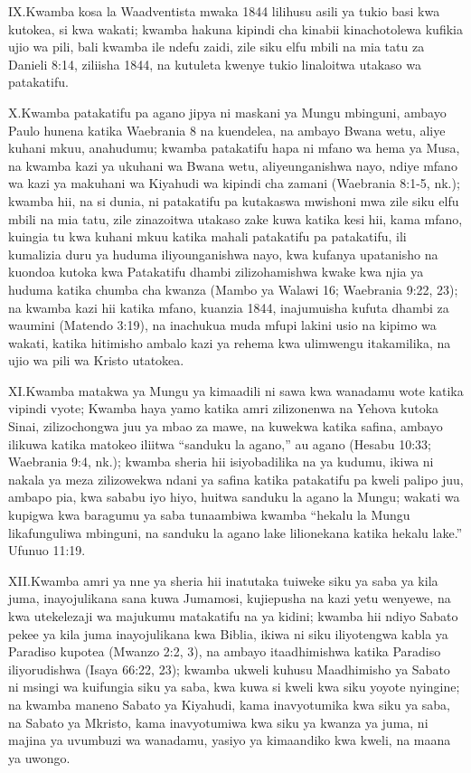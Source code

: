 \lettrine{IX.} Kwamba kosa la Waadventista mwaka 1844 lilihusu asili ya tukio basi kwa kutokea, si kwa wakati; kwamba hakuna kipindi cha kinabii kinachotolewa kufikia ujio wa pili, bali kwamba ile ndefu zaidi, zile siku elfu mbili na mia tatu za Danieli 8:14, ziliisha 1844, na kutuleta kwenye tukio linaloitwa utakaso wa patakatifu.


\lettrine{X.} Kwamba patakatifu pa agano jipya ni maskani ya Mungu mbinguni, ambayo Paulo hunena katika Waebrania 8 na kuendelea, na ambayo Bwana wetu, aliye kuhani mkuu, anahudumu; kwamba patakatifu hapa ni mfano wa hema ya Musa, na kwamba kazi ya ukuhani wa Bwana wetu, aliyeunganishwa nayo, ndiye mfano wa kazi ya makuhani wa Kiyahudi wa kipindi cha zamani (Waebrania 8:1-5, nk.); kwamba hii, na si dunia, ni patakatifu pa kutakaswa mwishoni mwa zile siku elfu mbili na mia tatu, zile zinazoitwa utakaso zake kuwa katika kesi hii, kama mfano, kuingia tu kwa kuhani mkuu katika mahali patakatifu pa patakatifu, ili kumalizia duru ya huduma iliyounganishwa nayo, kwa kufanya upatanisho na kuondoa kutoka kwa Patakatifu dhambi zilizohamishwa kwake kwa njia ya huduma katika chumba cha kwanza (Mambo ya Walawi 16; Waebrania 9:22, 23); na kwamba kazi hii katika mfano, kuanzia 1844, inajumuisha kufuta dhambi za waumini (Matendo 3:19), na inachukua muda mfupi lakini usio na kipimo wa wakati, katika hitimisho ambalo kazi ya rehema kwa ulimwengu itakamilika, na ujio wa pili wa Kristo utatokea.


\lettrine{XI.} Kwamba matakwa ya Mungu ya kimaadili ni sawa kwa wanadamu wote katika vipindi vyote; Kwamba haya yamo katika amri zilizonenwa na Yehova kutoka Sinai, zilizochongwa juu ya mbao za mawe, na kuwekwa katika safina, ambayo ilikuwa katika matokeo iliitwa “sanduku la agano,” au agano (Hesabu 10:33; Waebrania 9:4, nk.); kwamba sheria hii isiyobadilika na ya kudumu, ikiwa ni nakala ya meza zilizowekwa ndani ya safina katika patakatifu pa kweli palipo juu, ambapo pia, kwa sababu iyo hiyo, huitwa sanduku la agano la Mungu; wakati wa kupigwa kwa baragumu ya saba tunaambiwa kwamba “hekalu la Mungu likafunguliwa mbinguni, na sanduku la agano lake lilionekana katika hekalu lake.” Ufunuo 11:19.


\lettrine{XII.} Kwamba amri ya nne ya sheria hii inatutaka tuiweke siku ya saba ya kila juma, inayojulikana sana kuwa Jumamosi, kujiepusha na kazi yetu wenyewe, na kwa utekelezaji wa majukumu matakatifu na ya kidini; kwamba hii ndiyo Sabato pekee ya kila juma inayojulikana kwa Biblia, ikiwa ni siku iliyotengwa kabla ya Paradiso kupotea (Mwanzo 2:2, 3), na ambayo itaadhimishwa katika Paradiso iliyorudishwa (Isaya 66:22, 23); kwamba ukweli kuhusu Maadhimisho ya Sabato ni msingi wa kuifungia siku ya saba, kwa kuwa si kweli kwa siku yoyote nyingine; na kwamba maneno Sabato ya Kiyahudi, kama inavyotumika kwa siku ya saba, na Sabato ya Mkristo, kama inavyotumiwa kwa siku ya kwanza ya juma, ni majina ya uvumbuzi wa wanadamu, yasiyo ya kimaandiko kwa kweli, na maana ya uwongo.


